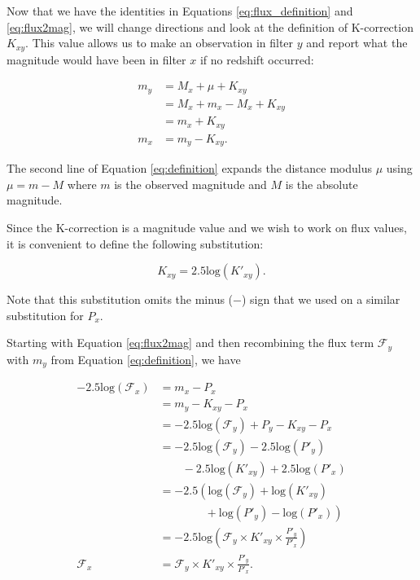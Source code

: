 Now that we have the identities in Equations \ref{eq:flux_definition} and
\ref{eq:flux2mag}, we will change directions and look at the definition of
K-correction $K_{xy}$. This value allows us to make an observation in filter
$y$ and report what the magnitude would have been in filter $x$ if no redshift
occurred:

\begin{equation}
\begin{aligned}
\label{eq:definition}
  m_y &= M_x + \mu + K_{xy} \\
      &= M_x + m_x - M_x + K_{xy} \\
      &= m_x + K_{xy} \\
  m_x &= m_y - K_{xy} .
\end{aligned}
\end{equation}

\noindent The second line of Equation \ref{eq:definition} expands the distance modulus
$\mu$ using $\mu = m - M$ where $m$ is the observed magnitude and $M$ is the
absolute magnitude.

Since the K-correction is a magnitude value and we wish to work on flux values,
it is convenient to define the following substitution:

\begin{equation}
\label{eq:k_substitution}
  K_{xy} = 2.5\text{log}(K'_{xy}) .
\end{equation}

\noindent Note that this substitution omits the minus ($-$) sign that we used on a
similar substitution for $P_x$.

Starting with Equation \ref{eq:flux2mag} and then
recombining the flux term $\mathcal{F}_y$ with $m_y$ from Equation
\ref{eq:definition}, we have

\begin{equation}
\begin{aligned}
\label{eq:as_flux}
  -2.5 \text{log}(\mathcal{F}_x)
      &= m_x - P_x \\
      &= m_y - K_{xy} - P_x \\
      &= -2.5 \text{log}(\mathcal{F}_y) + P_y - K_{xy} - P_x \\
      &= -2.5 \text{log}(\mathcal{F}_y) - 2.5 \text{log}(P'_y) \\
         &\qquad - 2.5 \text{log}(K'_{xy}) + 2.5 \text{log}(P'_x) \\
      &= -2.5 \left(\text{log}(\mathcal{F}_y) + \text{log}(K'_{xy}) \right. \\
         &\qquad\qquad + \left. \text{log}(P'_y) - \text{log}(P'_x)
        \right) \\
      &= -2.5 \text{log}\left(
        \mathcal{F}_y
        \times K'_{xy}
        \times \frac{P'_y}{P'_x}\right) \\
  \mathcal{F}_x &= \mathcal{F}_y \times K'_{xy} \times \frac{P'_y}{P'_x}.
\end{aligned}
\end{equation}

